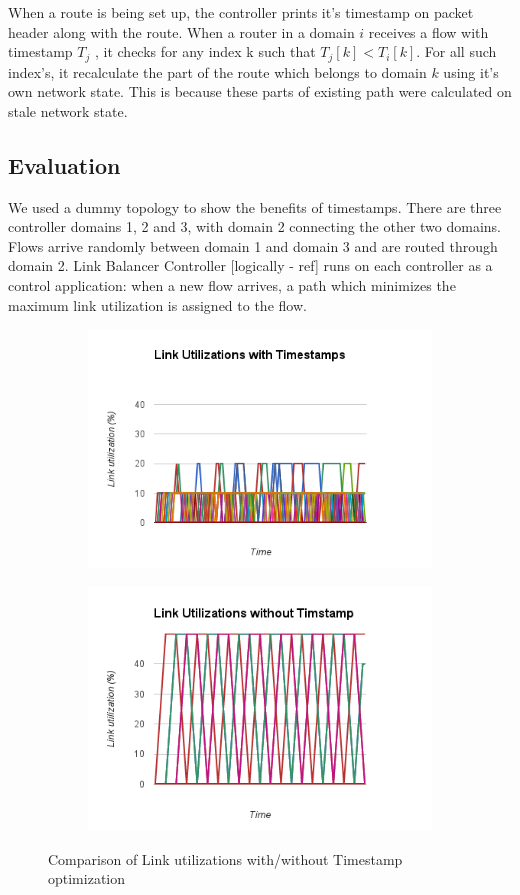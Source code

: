 \documentclass[10pt, twocolumn]{article}
\begin{document}
When a route is being set up, the controller prints it's timestamp on packet header along with the route. When a router in a domain $i$ receives a flow with timestamp $T_{j}$ , it checks for any index k such that $T_{j} [k] < T_{i} [k]$. For all such index's, it recalculate the part of the route which belongs to domain $k$ using it's own network state. This is because these parts of existing path were calculated on stale network state.  
  
\subsection{Evaluation}
We used a dummy topology to show the benefits of timestamps. There are three controller domains 1, 2 and 3, with domain 2 connecting the other two domains. Flows arrive randomly between domain 1 and domain 3 and are routed through domain 2. Link Balancer Controller [logically - ref] runs on each controller as a control application: when a new flow arrives, a path which minimizes the maximum link utilization is assigned to the flow.

\begin{figure}

\begin{subfigure}{.5\textwidth}
 \includegraphics[scale=0.4]{chart_1}
\end{subfigure}
\begin{subfigure}{.5\textwidth}
 \includegraphics[scale=0.4]{chart_2}
\end{subfigure}
\caption{Comparison of Link utilizations with/without Timestamp optimization}
\label{fig:timestamp}
\end{figure}
\end{document}
